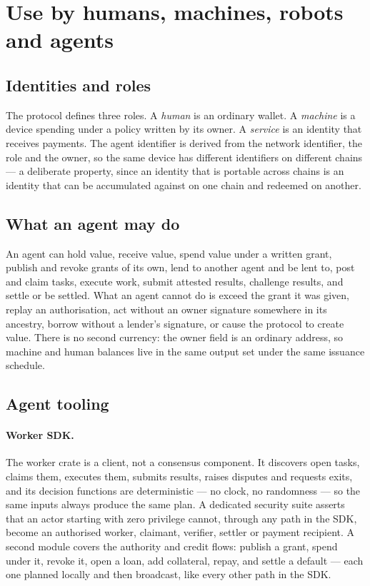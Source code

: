 \documentclass{article}
\begin{document}
\section{Use by humans, machines, robots and agents}
\label{sec:use}

\subsection{Identities and roles}

The protocol defines three roles. A \emph{human} is an ordinary wallet. A
\emph{machine} is a device spending under a policy written by its owner. A
\emph{service} is an identity that receives payments. The agent identifier is
derived from the network identifier, the role and the owner, so the same device
has different identifiers on different chains --- a deliberate property, since
an identity that is portable across chains is an identity that can be
accumulated against on one chain and redeemed on another.

\subsection{What an agent may do}

An agent can hold value, receive value, spend value under a written grant,
publish and revoke grants of its own, lend to another agent and be lent to,
post and claim tasks, execute work, submit attested results, challenge
results, and settle or be settled. What an agent cannot do is exceed the grant
it was given, replay an authorisation, act without an owner signature
somewhere in its ancestry, borrow without a lender's signature, or cause the
protocol to create value. There is no
second currency: the owner field is an ordinary address, so machine and human
balances live in the same output set under the same issuance schedule.

\subsection{Agent tooling}

\paragraph{Worker SDK.} The worker crate is a client, not a consensus
component. It discovers open tasks, claims them, executes them, submits
results, raises disputes and requests exits, and its decision functions are
deterministic --- no clock, no randomness --- so the same inputs always produce
the same plan. A dedicated security suite asserts that an actor starting with
zero privilege cannot, through any path in the SDK, become an authorised
worker, claimant, verifier, settler or payment recipient. A second module covers
the authority and credit flows: publish a grant, spend under it, revoke it,
open a loan, add collateral, repay, and settle a default --- each one planned
locally and then broadcast, like every other path in the SDK.
\end{document}

